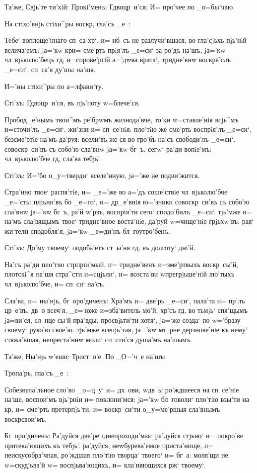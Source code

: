 Та'же, Свjь'те ти'хiй: Прокi'менъ: Гд воцр~и'ся: И= 
про'чее по _о=бы'чаю. 

На стiхо'внjь стiхи^ры воскр, гла'съ _е~:

Тебе` воплоще'ннаго сп~са хр`, и= нб~съ не 
разлучи'вшася, во гла'сjьхъ пjь'нiй велича'емъ: jа='кw 
кр и= сме'рть прiя'лъ _е=си` за ро'дъ на'шъ, jа='кw 
чл~вjьколю'бецъ гд, и=спрове'ргiй а='дwва врата`, 
тридне'внw воскре'слъ _е=си`, сп~са'я ду'шы на'шя.

И='ны стiхи^ры по а=лфави'ту. 

Стi'хъ: Гд воцр~и'ся, въ лjь'поту w=блече'ся. 

Пробод_е'нымъ твои^мъ ре'брwмъ жизнода'вче, то'ки 
w=ставле'нiя всjь^мъ и=сточи'лъ _е=си`, жи'зни и= 
сп~се'нiя: пло'тiю же сме'рть воспрiя'лъ _е=си`, 
безсме'ртiе на'мъ да'руя: всели'въ же ся во гро'бъ на'съ 
свободи'лъ _е=си`, совоскр~си'въ съ собо'ю сла'внw jа='кw 
бг~ъ. сегw` ра'ди вопiе'мъ: чл~вjьколю'бче гд, сла'ва 
тебjь`.

Стi'хъ: И='бо о_у=тверди` вселе'нную, jа='же не 
подви'жится. 

Стра'нно твое` распя'тiе, и= _е='же во а='дъ 
соше'ствiе чл~вjьколю'бче _е='сть: плjьни'въ бо _е=го`, 
и= др_е'внiя ю='зники совоскр~си'въ съ собо'ю сла'внw 
jа='кw бг~ъ, ра'й w'рзъ, воспрiя'ти сего` сподо'билъ 
_е=си`. тjь'мже и= на'мъ сла'вящымъ твое` тридне'вное 
воста'нiе, да'руй w=чище'нiе грjьхw'въ: рая` жи'тели 
сподобля'я, jа='кw _е=ди'нъ бл~гоутро'бенъ. 

Стi'хъ: До'му твоему` подоба'етъ ст~ы'ня гд, въ 
долготу` днi'й. 

На'съ ра'ди пло'тiю стр прiи'мый, и= тридне'венъ 
и=з\ъ ме'ртвыхъ воскр~сы'й, плотскi^я на'шя стра^сти 
и=сцjьли`, и= возста'ви w\т прегрjьше'нiй лю'тыхъ 
чл~вjьколю'бче, и= сп~си` на'съ.

Сла'ва, и= ны'нjь, бг~оро'диченъ: Хра'мъ и= две'рь 
_е=си`, пала'та и= пр'лъ цр~е'въ, дв~о всеч'я, 
_е='юже и=зба'витель мо'й, хр'съ гд, во тьмjь` 
спя'щымъ jа=ви'ся, сл~нце сы'й пра'вды, просвjьти'ти 
хотя`, jа=`же созда` по w='бразу своему` руко'ю свое'ю. 
тjь'мже всепjь'тая, jа='кw мт~рне дерзнове'нiе къ нему` 
стяжа'вшая, непреста'ннw моли` сп~сти'ся душа'мъ на'шымъ. 

Та'же, Ны'нjь w'еши: Трист~о'е. По _О='ч~е 
на'шъ:

Тропа'рь, гла'съ _е~:

Собезнача'льное сло'во _о=ц~у` и= дх~ови, w\т дв~ы 
ро'ждшееся на сп~се'нiе на'ше, воспои'мъ вjь'рнiи и= 
поклони'мся: jа='кw бл~говоли` пло'тiю взы'ти на кр, 
и= сме'рть претерпjь'ти, и= воскр~си'ти о_у=ме'ршыя 
сла'внымъ воскр свои'мъ.

Бг~оро'диченъ: Ра'дуйся две'ре гд непроходи'мая: 
ра'дуйся стjьно` и= покро'ве притека'ющихъ къ тебjь`. 
ра'дуйся, неwбурева'емое приста'нище, и= 
неискусобра'чная, ро'ждшая пло'тiю творца` твоего` и= 
бг~а: моля'щи не w=скудjьва'й w= воспjьва'ющихъ, и= 
кла'няющихся рж` твоему`.

